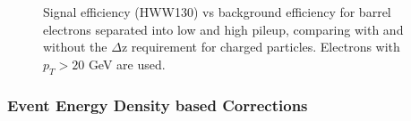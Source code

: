 \begin{figure}[!htbp]
\begin{center}
\caption{ Signal efficiency (HWW130) vs background efficiency for barrel electrons separated into 
low and high pileup, comparing with and without the $\Delta$z requirement for charged particles.
Electrons with $p_{T} > 20$ GeV are used. }
\label{fig:IsoPerformance_EleBarrel_dZCut}
\end{center}
\end{figure}


\subsubsection{Event Energy Density based Corrections}
\label{sec:CorrectionBasedIsolation}

